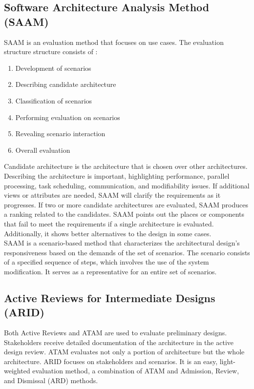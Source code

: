 \documentclass[12pt,a4paper]{article}
\begin{document}
{\subsection{Software Architecture Analysis Method (SAAM)}

SAAM is an evaluation method that focuses on use cases. The evaluation structure structure consists of : \cite{r41}

\begin{enumerate}

\item Development of scenarios \cite{r41}
\item Describing candidate architecture \cite{r41}
\item Classification of scenarios \cite{r41}
\item Performing evaluation on scenarios \cite{r41}
\item Revealing scenario interaction \cite{r41}
\item Overall evaluation \cite{r41}

\end{enumerate}

Candidate architecture is the architecture that is chosen over other architectures. Describing the architecture is important, highlighting performance, parallel processing, task scheduling, communication, and modifiability issues. If additional views or attributes are needed, SAAM will clarify the requirements as it progresses. If two or more candidate architectures are evaluated, SAAM produces a ranking related to the candidates. SAAM points out the places or components that fail to meet the requirements if a single architecture is evaluated. Additionally, it shows better alternatives to the design in some cases. \cite{r41} \\

SAAM is a scenario-based method that characterizes the architectural design's responsiveness based on the demands of the set of scenarios. The scenario consists of a specified sequence of steps, which involves the use of the system modification. It serves as a representative for an entire set of scenarios. \cite{r41} 


\subsection{Active Reviews for Intermediate Designs (ARID)}

Both Active Reviews and ATAM are used to evaluate preliminary designs. Stakeholders receive detailed documentation of the architecture in the active design review. ATAM evaluates not only a portion of architecture but the whole architecture. ARID focuses on stakeholders and scenarios. It is an easy, light-weighted evaluation method, a combination of ATAM and Admission, Review, and Dismissal (ARD) methods. \cite{r42} \\

}
\end{document}
